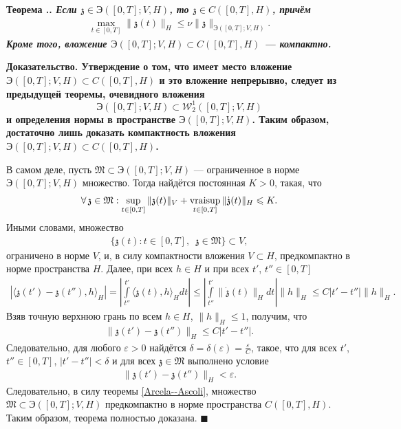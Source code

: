 \documentclass{report}
\newcounter{rem}[section]
\newcounter{theor}[section]
\renewcommand{\thetheor}{\thesection.\arabic{theor}}
\newenvironment{Theorem}{\par\refstepcounter{theor}\bf Теорема \thetheor. \it}{\rm\par}
\newenvironment{Proof}{\par\noindent\bf Доказательство.\rm}{ $\blacksquare$\par}
\newcommand{\vraisup}{\mathop{\rm vraisup}}
\begin{document}
\begin{Theorem}\label{abstact_energetic_class_embedding:Theorem}
Если $\mathfrak{z}\in \textrm{Э}([0,T];V,H)$, то $\mathfrak{z}\in C([0,T],H)$, причём
\begin{gather*}
\max\limits_{t\in[0,T]}\|\mathfrak{z}(t)\|_H\leqslant\nu\|\mathfrak{z}\|_{\textrm{Э}([0,T];V,H)}.
\end{gather*}
Кроме того, вложение $\textrm{Э}([0,T];V,H)\subset C([0,T],H)$ --- компактно.
\end{Theorem}
\begin{Proof} Утверждение о том, что имеет место вложение $\textrm{Э}([0,T];V,H)\subset C([0,T],H)$ и это вложение непрерывно, следует из
предыдущей теоремы, очевидного вложения $$\textrm{Э}([0,T];V,H)\subset\mathcal{W}^1_2([0,T];V,H)$$ и определения нормы в пространстве $\textrm{Э}([0,T];V,H)$.
Таким образом, достаточно лишь доказать компактность вложения $\textrm{Э}([0,T];V,H)\subset C([0,T],H)$.

В самом деле, пусть $\mathfrak{M}\subset \textrm{Э}([0,T];V,H)$ --- ограниченное в норме $\textrm{Э}([0,T];V,H)$ множество. Тогда найдётся постоянная $K>0$, такая, что
\begin{gather*}
\forall\,\mathfrak{z}\in\mathfrak{M}:\sup\limits_{t\in[0,T]}\|\mathfrak{z}(t)\|_V+\vraisup\limits_{t\in[0,T]}\|\dot{\mathfrak{z}}(t)\|_H
\leqslant K.
\end{gather*}
Иными словами, множество
\begin{gather*}
\{\mathfrak{z}(t):t\in[0,T],\,\,\,\mathfrak{z}\in\mathfrak{M}\}\subset V,
\end{gather*}
ограничено в норме $V$, и, в силу компактности вложения $V\subset H$, предкомпактно в норме пространства $H$. Далее, при всех $h\in H$ и при всех $t'$, $t''\in[0,T]$
\begin{gather*}
|\langle\mathfrak{z}(t')-\mathfrak{z}(t''),h\rangle_H|=\left|\int\limits_{t''}^{t'}\langle\dot{\mathfrak{z}}(t),h\rangle_Hdt\right|
\leqslant\left|\int\limits_{t''}^{t'}\|\dot{\mathfrak{z}}(t)\|_Hdt\right|\|h\|_H\leqslant C|t'-t''|\|h\|_H.
\end{gather*}
Взяв точную верхнюю грань по всем $h\in H$, $\|h\|_H\leqslant1$, получим, что
\begin{gather*}
\|\mathfrak{z}(t')-\mathfrak{z}(t'')\|_H\leqslant C|t'-t''|.
\end{gather*}
Следовательно, для любого $\varepsilon>0$ найдётся $\delta=\delta(\varepsilon)=\frac\varepsilon C$, такое, что для всех $t'$, $t''\in[0,T]$, $|t'-t''|<\delta$ и для всех $\mathfrak{z}\in
\mathfrak{M}$ выполнено  условие
\begin{gather*}
\|\mathfrak{z}(t')-\mathfrak{z}(t'')\|_H<\varepsilon.
\end{gather*}
Следовательно, в силу теоремы \ref{Arcela--Ascoli}, множество $\mathfrak{M}\subset \textrm{Э}([0,T];V,H)$ предкомпактно в норме пространства $C([0,T],H)$. Таким образом, теорема полностью
доказана.
\end{Proof}
\end{document}
